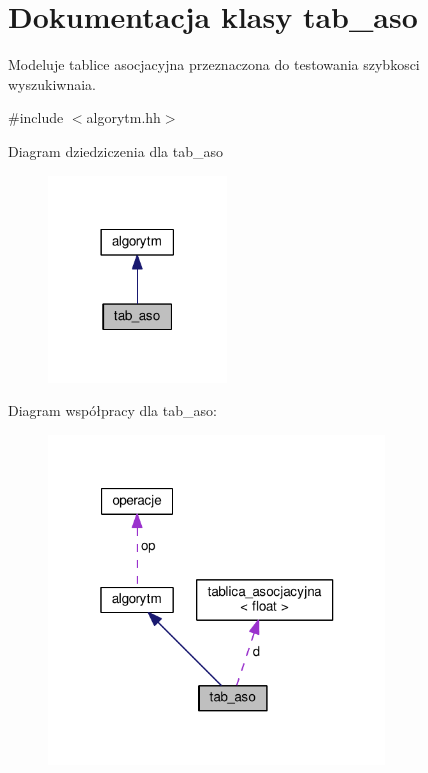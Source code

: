 \hypertarget{classtab__aso}{\section{Dokumentacja klasy tab\-\_\-aso}
\label{classtab__aso}
}


Modeluje tablice asocjacyjna przeznaczona do testowania szybkosci wyszukiwnaia.  




{\ttfamily \#include $<$algorytm.\-hh$>$}



Diagram dziedziczenia dla tab\-\_\-aso\nopagebreak
\begin{figure}[H]
\begin{center}
\leavevmode
\includegraphics[width=134pt]{classtab__aso__inherit__graph}
\end{center}
\end{figure}


Diagram współpracy dla tab\-\_\-aso\-:\nopagebreak
\begin{figure}[H]
\begin{center}
\leavevmode
\includegraphics[width=253pt]{classtab__aso__coll__graph}
\end{center}
\end{figure}
